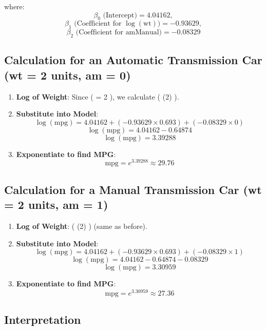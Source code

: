 \documentclass[
  letterpaper,
  DIV=11,
  numbers=noendperiod]{scrreport}
\providecommand{\tightlist}{%
  \setlength{\itemsep}{0pt}\setlength{\parskip}{0pt}}\usepackage{longtable,booktabs,array}
\begin{document}
where: \[
\beta_0 \text{ (Intercept)} = 4.04162,
\] \[
\beta_1 \text{ (Coefficient for } \log(\text{wt})) = -0.93629,
\] \[
\beta_2 \text{ (Coefficient for } \text{amManual}) = -0.08329
\]

\subsection{Calculation for an Automatic Transmission Car (wt = 2 units,
am =
0)}\label{calculation-for-an-automatic-transmission-car-wt-2-units-am-0}

\begin{enumerate}
\def\labelenumi{\arabic{enumi}.}
\tightlist
\item
  \textbf{Log of Weight}: Since (  = 2 ), we calculate (
  \log(2)  ).
\item
  \textbf{Substitute into Model}: \[
  \log(\text{mpg}) = 4.04162 + (-0.93629 \times 0.693) + (-0.08329 \times 0)
  \] \[
  \log(\text{mpg}) = 4.04162 - 0.64874
  \] \[
  \log(\text{mpg}) = 3.39288
  \]
\item
  \textbf{Exponentiate to find MPG}: \[
  \text{mpg} = e^{3.39288} \approx 29.76
  \]
\end{enumerate}

\subsection{Calculation for a Manual Transmission Car (wt = 2 units, am
= 1)}\label{calculation-for-a-manual-transmission-car-wt-2-units-am-1}

\begin{enumerate}
\def\labelenumi{\arabic{enumi}.}
\tightlist
\item
  \textbf{Log of Weight}: ( \log(2)  ) (same as before).
\item
  \textbf{Substitute into Model}: \[
  \log(\text{mpg}) = 4.04162 + (-0.93629 \times 0.693) + (-0.08329 \times 1)
  \] \[
  \log(\text{mpg}) = 4.04162 - 0.64874 - 0.08329
  \] \[
  \log(\text{mpg}) = 3.30959
  \]
\item
  \textbf{Exponentiate to find MPG}: \[
  \text{mpg} = e^{3.30959} \approx 27.36
  \]
\end{enumerate}

\subsection{Interpretation}\label{interpretation}
\end{document}
